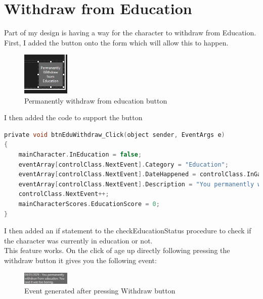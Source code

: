 \section{Withdraw from Education}
Part of my design is having a way for the character to withdraw from Education.\\
First, I added the button onto the form which will allow this to happen.
\begin{figure}[H]
    \centering
    \includegraphics[width=0.2\textwidth]{images/implementation/withdraw1.png}
    \caption{Permanently withdraw from education button}
    \label{fig:implementation-withdraw1}
\end{figure}
\noindent I then added the code to support the button
\begin{lstlisting}[language=c, style=csharp, caption=Withdraw from Education button code]
private void btnEduWithdraw_Click(object sender, EventArgs e)
{
    mainCharacter.InEducation = false;
    eventArray[controlClass.NextEvent].Category = "Education";
    eventArray[controlClass.NextEvent].DateHappened = controlClass.InGameDate;
    eventArray[controlClass.NextEvent].Description = "You permanently withdrew from education. You said it was too boring.";
    controlClass.NextEvent++;
    mainCharacterScores.EducationScore = 0;
}
\end{lstlisting}
I then added an if statement to the checkEducationStatus procedure to check if the character was currently in education or not.\\
This feature works. On the click of age up directly following pressing the withdraw button it gives you the following event:
\begin{figure}[H]
    \centering
    \includegraphics[width=0.2\textwidth]{images/implementation/withdraw2.png}
    \caption{Event generated after pressing Withdraw button}
    \label{fig:implementation-withdraw2}
\end{figure}

